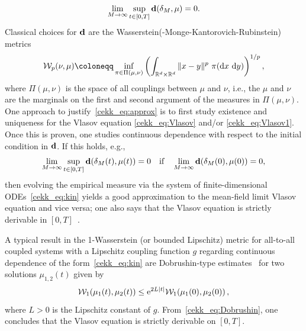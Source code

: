 \documentclass[10pt]{article}
\begin{document}
\begin{equation}
	\label{cekk_eq:approx}
	\lim_{M\rightarrow \infty}\sup_{t\in[0,T]}{\bf d}(\delta_M,\mu)=0.
\end{equation}
Classical choices for ${\bf d}$ are the Wasserstein(-Monge-Kantorovich-Rubinstein)~\cite{Golse,Villani1} metrics
\begin{equation}
	\mathcal{W}_{p}(\nu,\mu)\coloneqq \inf_{\pi\in \Pi(\mu,\nu)} \left(\int_{\mathbb{R}^d\times \mathbb{R}^d} \|x-y\|^p~\pi(\textnormal{d} x~\textnormal{d} y)\right)^{1/p},
\end{equation}  
where $\Pi(\mu,\nu)$ is the space of all couplings between $\mu$ and $\nu$, i.e., the $\mu$ and $\nu$ are the marginals on the first and second argument of the measures in $\Pi(\mu,\nu)$. One approach to justify~\eqref{cekk_eq:approx} is to first study existence and uniqueness for the Vlasov equation \eqref{cekk_eq:Vlasov} and/or \eqref{cekk_eq:Vlasov1}. Once this is proven, one studies continuous dependence with respect to the initial condition in ${\bf d}$. If this holds, e.g., 
\begin{equation}
	\label{cekk_eq:approx1}
	\lim_{M\rightarrow \infty}\sup_{t\in[0,T]}{\bf d}(\delta_M(t),\mu(t))=0\quad \text{if}\quad \lim_{M\rightarrow \infty}{\bf d}(\delta_M(0),\mu(0))=0,
\end{equation}
then evolving the empirical measure via the system of finite-dimensional ODEs~\eqref{cekk_eq:kin} yields a good approximation to the mean-field limit Vlasov equation and vice versa; one also says that the Vlasov equation is strictly derivable in $[0,T]$~\cite{BraunHepp,Golse,KuehnBook1,Neunzert}. 

A typical result in the 1-Wasserstein (or bounded Lipschitz) metric for all-to-all coupled systems with a Lipschitz coupling function $g$ regarding continuous dependence of the form~\eqref{cekk_eq:kin} are Dobrushin-type estimates~\cite{Dobrushin,Dobrushin1} for two solutions $\mu_{1,2}(t)$ given by 
\begin{equation}
	\label{cekk_eq:Dobrushin}
	\mathcal{W}_{1}(\mu_1(t),\mu_2(t)) \leq \textnormal{e}^{2L|t|} \mathcal{W}_{1}(\mu_1(0),\mu_2(0))\,,
\end{equation}
where $L>0$ is the Lipschitz constant of $g$. From~\eqref{cekk_eq:Dobrushin}, one concludes that the Vlasov equation is strictly derivable on $[0,T]$. 
\end{document}
